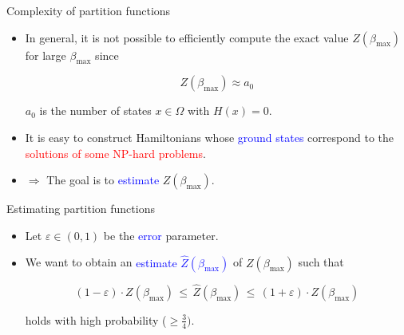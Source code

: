 \documentclass{beamer}
\renewcommand{\>}{\rangle}
\newcommand{\<}{\langle}
\begin{document}
\begin{frame}{Complexity of partition functions}
    \begin{itemize}
        \item In general, it is not possible to efficiently compute the exact value $Z(\beta_{\max})$ for large $\beta_{\max}$ since
        
        \begin{equation*}
            Z(\beta_{\max}) \approx a_0
        \end{equation*}
        
        \medskip
        $a_0$ is the number of states $x\in\Omega$ with $H(x)=0$.
    
        \medskip
        \item It is easy to construct Hamiltonians whose \textcolor{blue}{ground states} correspond to the \textcolor{red}{solutions of some NP-hard problems}.
    
        \medskip
        \item $\Longrightarrow$ The goal is to \textcolor{blue}{estimate} $Z(\beta_{\max})$.
    \end{itemize}

\end{frame}

%

\begin{frame}{Estimating partition functions}

\begin{itemize}
    \item Let $\varepsilon\in(0,1)$ be the \textcolor{blue}{error} parameter.
    
    \medskip
    \item We want to obtain an \textcolor{blue}{estimate $\hat{Z}(\beta_{\max})$} of $Z(\beta_{\max})$ such that
    
    \begin{equation*}
        (1 - \varepsilon) \cdot Z(\beta_{\max}) \, \le \,
        \hat{Z}(\beta_{\max}) \, \le \,
        (1 + \varepsilon) \cdot Z(\beta_{\max})
    \end{equation*}
    
    \medskip
    holds with high probability ($\ge \frac{3}{4})$.
\end{itemize}

\end{frame}

%
\end{document}
